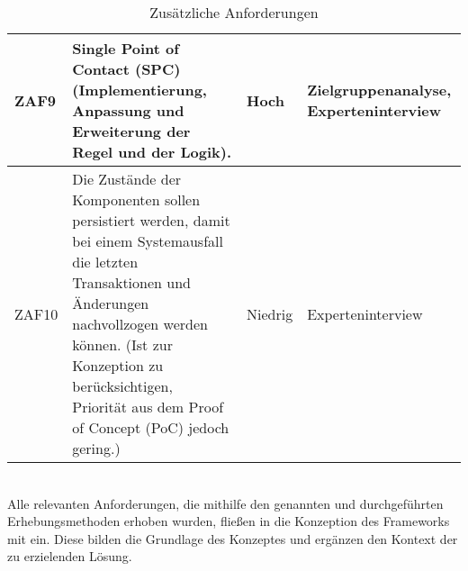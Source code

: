 \begin{table}[hbt!]
\begin{center}
\begin{tabular}{ | p{1.0cm} | p{9.2cm} | p{1.6cm} | p{3.1cm} | }
            \hline
                ZAF9 & Single Point of Contact (SPC) (Implementierung, Anpassung und Erweiterung der Regel und der Logik). & Hoch & Zielgruppenanalyse, Experteninterview \\ 
            \hline
                ZAF10 & Die Zustände der Komponenten sollen persistiert werden, damit bei einem Systemausfall die letzten Transaktionen und Änderungen nachvollzogen werden können. (Ist zur Konzeption zu berücksichtigen, Priorität aus dem Proof of Concept (PoC) jedoch gering.) & Niedrig & Experteninterview \\ 
            \hline 
        \end{tabular}
    \end{center}
    \caption{Zusätzliche Anforderungen}
    \label{tab:furtherRequirements}
\end{table} 
\\
Alle relevanten Anforderungen, die mithilfe den genannten und durchgeführten Erhebungsmethoden erhoben wurden, fließen in die Konzeption 
des Frameworks mit ein. Diese bilden die Grundlage des Konzeptes und ergänzen den Kontext der zu erzielenden Lösung.
